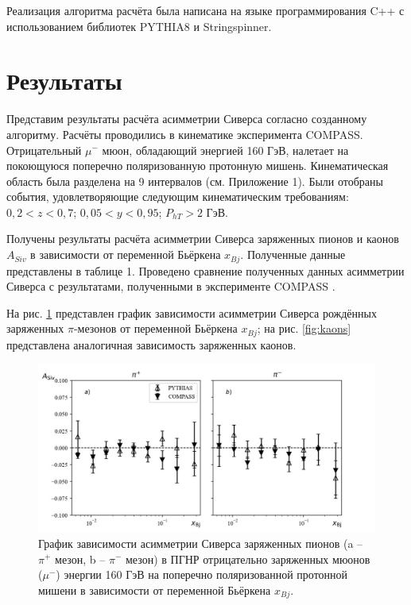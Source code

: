\documentclass{extreport}
\begin{document}
Реализация алгоритма расчёта была написана на языке программирования C++ с использованием библиотек PYTHIA8 и Stringspinner. 

\section{Результаты}

Представим результаты расчёта асимметрии Сиверса согласно созданному алгоритму. 
Расчёты проводились в кинематике эксперимента COMPASS. Отрицательный $\mu^-$ мюон, обладающий энергией 160 ГэВ, налетает на покоющуюся поперечно поляризованную протонную мишень.
Кинематическая область была разделена на 9 интервалов (см. Приложение 1). Были отобраны события, удовлетворяющие следующим кинематическим требованиям: $0,2 < z < 0,7$; $0,05 < y < 0,95$; $P_{hT} > 2$ ГэВ.

Получены результаты расчёта асимметрии Сиверса заряженных пионов и каонов $A_{Siv}$ в зависимости от переменной Бьёркена $x_{Bj}$. Полученные данные представлены в таблице 1. Проведено сравнение полученных данных асимметрии Сиверса с результатами, полученными в эксперименте COMPASS \cite{Abbon_2007}. 

На рис. \ref{fig:pions} представлен график зависимости асимметрии Сиверса рождённых заряженных $\pi$-мезонов от переменной Бьёркена $x_{Bj}$; на рис. \ref{fig:kaons} представлена аналогичная зависимость заряженных каонов.

\begin{figure}[h]
	\centering
	\includegraphics[width=\linewidth]{pion.jpg}
	\caption{График зависимости асимметрии Сиверса заряженных пионов (a -- $\pi^+$ мезон, b -- $\pi^-$ мезон) в ПГНР отрицательно заряженных мюонов ($\mu^-$) энергии 160 ГэВ на поперечно поляризованной протонной мишени в зависимости от переменной Бьёркена $x_{Bj}$. }
	\label{fig:pions}
\end{figure}
\end{document}
